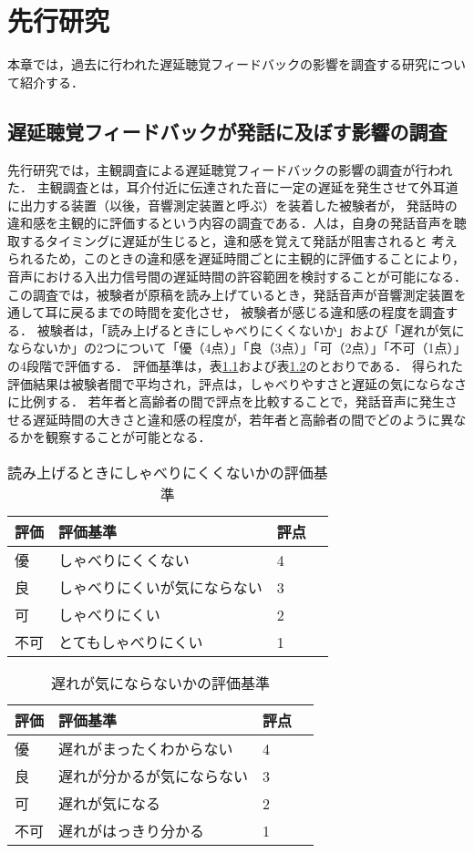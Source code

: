 \chapter{先行研究}
本章では，過去に行われた遅延聴覚フィードバックの影響を調査する研究について紹介する．
\section{遅延聴覚フィードバックが発話に及ぼす影響の調査}
先行研究\cite{kayama}では，主観調査による遅延聴覚フィードバックの影響の調査が行われた．
主観調査とは，耳介付近に伝達された音に一定の遅延を発生させて外耳道に出力する装置（以後，音響測定装置と呼ぶ）を装着した被験者が，
発話時の違和感を主観的に評価するという内容の調査である．人は，自身の発話音声を聴取するタイミングに遅延が生じると，違和感を覚えて発話が阻害されると
考えられるため，このときの違和感を遅延時間ごとに主観的に評価することにより，音声における入出力信号間の遅延時間の許容範囲を検討することが可能になる．
この調査では，被験者が原稿を読み上げているとき，発話音声が音響測定装置を通して耳に戻るまでの時間を変化させ，
被験者が感じる違和感の程度を調査する．
被験者は，「読み上げるときにしゃべりにくくないか」および「遅れが気にならないか」の2つについて「優（4点）」「良（3点）」「可（2点）」「不可（1点）」の4段階で評価する．
評価基準は，表\ref{table:evaluation-1}および表\ref{table:evaluation-2}のとおりである．
得られた評価結果は被験者間で平均され，評点は，しゃべりやすさと遅延の気にならなさに比例する．
若年者と高齢者の間で評点を比較することで，発話音声に発生させる遅延時間の大きさと違和感の程度が，若年者と高齢者の間でどのように異なるかを観察することが可能となる．
\begin{table}[tbp]
  \caption{読み上げるときにしゃべりにくくないかの評価基準}
  \label{table:evaluation-1}
  \centering
  \begin{tabular}{lllc}
    \hline
    評価 & 評価基準 & 評点\\
    \hline \hline
    優  & しゃべりにくくない & 4\\
    良  & しゃべりにくいが気にならない & 3\\
    可  & しゃべりにくい & 2\\
    不可  & とてもしゃべりにくい & 1\\
    \hline
  \end{tabular}
\end{table}
\begin{table}[tbp]
  \caption{遅れが気にならないかの評価基準}
  \label{table:evaluation-2}
  \centering
  \begin{tabular}{lllc}
    \hline
    評価 & 評価基準 & 評点\\
    \hline \hline
    優  & 遅れがまったくわからない & 4\\
    良  & 遅れが分かるが気にならない & 3\\
    可  & 遅れが気になる & 2\\
    不可  & 遅れがはっきり分かる & 1\\
    \hline
  \end{tabular}
\end{table}
